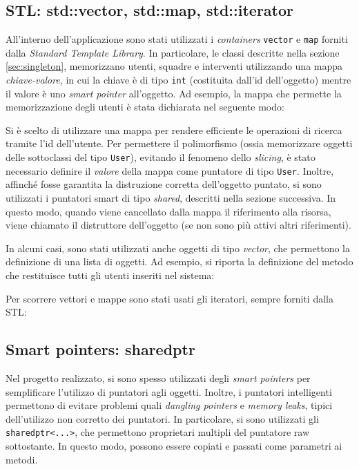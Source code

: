 \subsection{STL: std::vector, std::map, std::iterator}
All'interno dell'applicazione sono stati utilizzati i \textit{containers} \texttt{vector} e \texttt{map} forniti dalla \textit{Standard Template Library}. In particolare, le classi descritte nella sezione \ref{sec:singleton}, memorizzano utenti, squadre e interventi utilizzando una mappa \textit{chiave-valore}, in cui la chiave è di tipo \texttt{int} (costituita dall'id dell'oggetto) mentre il valore è uno \textit{smart pointer} all'oggetto. Ad esempio, la mappa che permette la memorizzazione degli utenti è stata dichiarata nel seguente modo:

Si è scelto di utilizzare una mappa per rendere efficiente le operazioni di ricerca tramite l'id dell'utente. Per permettere il polimorfismo (ossia memorizzare oggetti delle sottoclassi del tipo \texttt{User}), evitando il fenomeno dello \textit{slicing}, è stato necessario definire il \textit{valore} della mappa come puntatore di tipo \texttt{User}. Inoltre, affinché fosse garantita la distruzione corretta dell'oggetto puntato, si sono utilizzati i puntatori smart di tipo \textit{shared}, descritti nella sezione successiva. In questo modo, quando viene cancellato dalla mappa il riferimento alla risorsa, viene chiamato il distruttore dell'oggetto (se non sono più attivi altri riferimenti).

In alcuni casi, sono stati utilizzati anche oggetti di tipo \textit{vector}, che permettono la definizione di una lista di oggetti. Ad esempio, si riporta la definizione del metodo che restituisce tutti gli utenti inseriti nel sistema:


Per scorrere vettori e mappe sono stati usati gli iteratori, sempre forniti dalla STL:


\subsection{Smart pointers: shared\textunderscore ptr} 
Nel progetto realizzato, si sono spesso utilizzati degli \textit{smart pointers} per semplificare l'utilizzo di puntatori agli oggetti. Inoltre, i puntatori intelligenti permettono di evitare problemi quali \textit{dangling pointers} e \textit{memory leaks}, tipici dell'utilizzo non corretto dei puntatori. In particolare, si sono utilizzati gli \texttt{shared\textunderscore ptr<...>}, che permettono proprietari multipli del puntatore raw sottostante. In questo modo, possono essere copiati e passati come parametri ai metodi.


